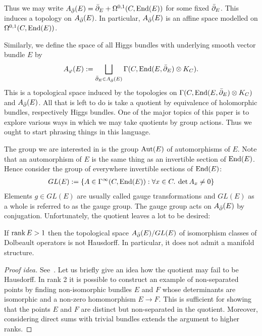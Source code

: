 \documentclass[12pt]{ociamthesis}  %
\begin{document}
Thus we may write $A_{\bar{\partial}} (E) = {\bar{\partial}}_E + \Omega^{0,1}(C,\operatorname{End}(E))$
for some fixed ${\bar{\partial}}_E$. This induces a topology on $A_{\bar{\partial}} (E)$.
In particular, $A_{\bar{\partial}} (E)$ is an affine space modelled on
$\Omega^{0,1}(C,\operatorname{End}(E))$.

Similarly, we define the space of all Higgs bundles with underlying
smooth vector bundle $E$ by
\begin{align*}
  A_\varphi(E) := \bigsqcup_{{\bar{\partial}}_E \in A_{\bar{\partial}} (E)} \Gamma(C,\operatorname{End}(E,{\bar{\partial}}_E)\otimes K_C).
\end{align*}
This is a topological space induced by the topologies on
$\Gamma(C,\operatorname{End}(E,{\bar{\partial}}_E)\otimes K_C)$ and $A_{\bar{\partial}} (E)$.
All that is left to do is take a quotient by equivalence of holomorphic
bundles, respectively Higgs bundles. One of the major topics of this
paper is to explore various ways in which we may take quotients by
group actions. Thus we ought to start phrasing things in this language.

The group we are interested in is the group $\operatorname{Aut}(E)$ of automorphisms
of $E$. Note that an automorphism of $E$ is the same thing as
an invertible section of $\operatorname{End}(E)$. Hence consider the group
of everywhere invertible sections of $\operatorname{End}(E)$:
\begin{align*}
  GL(E) := \{A \in \Gamma^\infty(C,\operatorname{End}(E)) : \forall x \in C.\:\det A_x \neq 0\}
\end{align*}
Elements $g\in GL(E)$ are usually called gauge transformations and
$GL(E)$ as a whole is referred to as the gauge group.
The gauge group acts on $A_{\bar{\partial}}(E)$ by conjugation.
Unfortunately, the quotient leaves a lot to be desired:
\begin{lemma}
  If $\operatorname{rank} E > 1$ then the topological space $A_{\bar{\partial}} (E)/GL(E)$
  of isomorphism classes of Dolbeault operators is not Hausdorff.
  In particular, it does not admit a manifold structure.
  \begin{proof}[Proof idea]
    See~\cite[Corollary 2]{norton1978}. Let us briefly give an idea
    how the quotient may fail to be Hausdorff. In rank 2 it is possible
    to construct an example of non-separated points by finding
    non-isomorphic bundles $E$ and $F$ whose determinants are
    isomorphic and a non-zero homomorphism $E\to F$. This is
    sufficient for showing that the points $E$ and $F$ are
    distinct but non-separated in the quotient. Moreover, considering
    direct sums with trivial bundles extends the argument to
    higher ranks.
  \end{proof}
\end{lemma}
\end{document}
